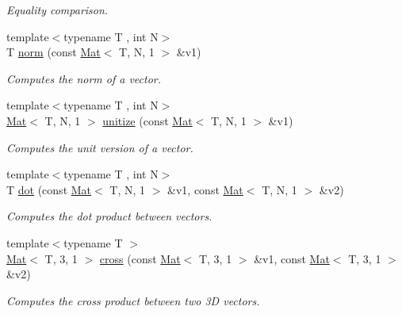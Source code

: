 \begin{DoxyCompactItemize}
\begin{DoxyCompactList}\small\item\em Equality comparison. \end{DoxyCompactList}\item 
{\footnotesize template$<$typename T , int N$>$ }\\T \mbox{\hyperlink{namespacetao_ac35e732bcf5d8bfb7df27de9fc96ba08}{norm}} (const \mbox{\hyperlink{classtao_1_1_mat}{Mat}}$<$ T, N, 1 $>$ \&v1)
\begin{DoxyCompactList}\small\item\em Computes the norm of a vector. \end{DoxyCompactList}\item 
{\footnotesize template$<$typename T , int N$>$ }\\\mbox{\hyperlink{classtao_1_1_mat}{Mat}}$<$ T, N, 1 $>$ \mbox{\hyperlink{namespacetao_a413b369fdee9e7ff22a073ef73d2e302}{unitize}} (const \mbox{\hyperlink{classtao_1_1_mat}{Mat}}$<$ T, N, 1 $>$ \&v1)
\begin{DoxyCompactList}\small\item\em Computes the unit version of a vector. \end{DoxyCompactList}\item 
{\footnotesize template$<$typename T , int N$>$ }\\T \mbox{\hyperlink{namespacetao_a01d099eba731722c912f651d0956dc42}{dot}} (const \mbox{\hyperlink{classtao_1_1_mat}{Mat}}$<$ T, N, 1 $>$ \&v1, const \mbox{\hyperlink{classtao_1_1_mat}{Mat}}$<$ T, N, 1 $>$ \&v2)
\begin{DoxyCompactList}\small\item\em Computes the dot product between vectors. \end{DoxyCompactList}\item 
{\footnotesize template$<$typename T $>$ }\\\mbox{\hyperlink{classtao_1_1_mat}{Mat}}$<$ T, 3, 1 $>$ \mbox{\hyperlink{namespacetao_a0d5250c98322b01437ae6be0d9bd478d}{cross}} (const \mbox{\hyperlink{classtao_1_1_mat}{Mat}}$<$ T, 3, 1 $>$ \&v1, const \mbox{\hyperlink{classtao_1_1_mat}{Mat}}$<$ T, 3, 1 $>$ \&v2)
\begin{DoxyCompactList}\small\item\em Computes the cross product between two 3D vectors. \end{DoxyCompactList}\item 
\mbox{\label{namespacetao_ab4a3ef7a2c09d666117ca335f94f60cb}} 

\end{DoxyCompactItemize}
